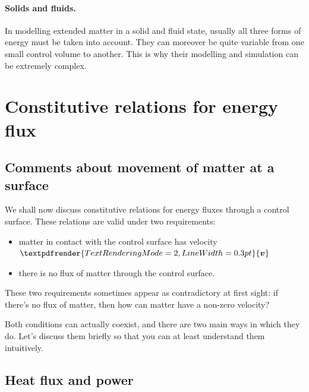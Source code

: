 \documentclass[a4paper,12pt,%
onecolumn,oneside,%
british%
]{memoir}
\renewcommand*{\bm}[1]{\textpdfrender{TextRenderingMode=2,LineWidth=0.3pt}{\boldsymbol{#1}}}
\renewcommand*{\|}[1][]{\nonscript\:#1\vert\nonscript\:\mathopen{}}
\newcommand*{\yv}{\bm{v}}
\begin{document}
\paragraph{Solids and fluids.}

In modelling extended matter in a solid and fluid state, usually all three forms of energy must be taken into account. They can moreover be quite variable from one small control volume to another. This is why their modelling and simulation can be extremely complex.

\section{Constitutive relations for energy flux}
\label{sec:energy_constitutive_flux}


\subsection{Comments about movement of matter at a surface}
\label{sec:matter_move_surface}

We shall now discuss constitutive relations for energy fluxes through a control surface. These relations are valid under two requirements:
\begin{itemize}[nosep]
\item matter in contact with the control surface has velocity $\yv$
\item there is no flux of matter through the control surface.
\end{itemize}

These two requirements sometimes appear as contradictory at first sight: if there's no flux of matter, then how can matter have a non-zero velocity?

Both conditions can actually coexist, and there are two main ways in which they do. Let's discuss them briefly so that you can at least understand them intuitively.


\subsection{Heat flux and power}
\label{sec:heating_power}
\end{document}
